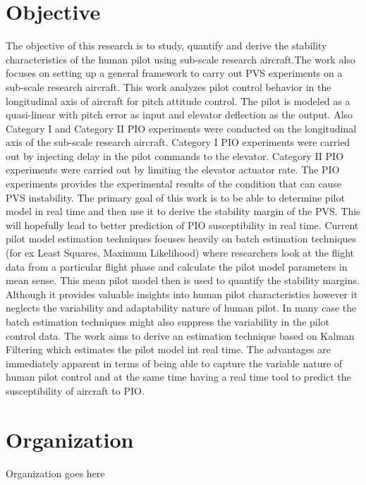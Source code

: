 \section{Objective}
\doublespacing
\par The objective of this research is to study, quantify and derive the stability characteristics of the human pilot using sub-scale research aircraft.The work also focuses on setting up a general framework to carry out PVS experiments on a sub-scale research aircraft. This work analyzes pilot control behavior in the longitudinal axis of aircraft for pitch attitude control. The pilot is modeled as a quasi-linear with pitch error as input and elevator deflection as the output. Also Category I and Category II PIO experiments were conducted on the longitudinal axis of the sub-scale research aircraft. Category I PIO experiments were carried out by injecting delay in the pilot commands to the elevator. Category II PIO experiments were carried out by limiting the elevator actuator rate. The PIO experiments provides the experimental results of the condition that can cause PVS instability. The primary goal of this work is to be able to determine pilot model in real time and then use it to derive the stability margin of the PVS. This will hopefully lead to better prediction of PIO susceptibility in real time. Current pilot model estimation techniques focuses heavily on batch estimation techniques (for ex Least Squares, Maximum Likelihood)\cite{pool2009pilot}\cite{mandalpilot} where researchers look at the flight data from a particular flight phase and calculate the pilot model parameters in mean sense. This mean pilot model then is used to quantify the stability margins. Although it provides valuable insights into human pilot characteristics however it neglects the variability and adaptability nature of human pilot. In many case the batch estimation techniques might also suppress the variability in the pilot control data. The work aims to derive an estimation technique based on Kalman Filtering which estimates the pilot model int real time. The advantages are immediately apparent in terms of being able to capture the variable nature of human pilot control and at the same time having a real time tool to predict the susceptibility of aircraft to PIO.


\section{Organization}
Organization goes here

